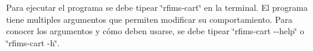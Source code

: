Para ejecutar el programa se debe tipear \char`\"{}rfims-\/cart\char`\"{} en la terminal. El programa tiene multiples argumentos que permiten modificar su comportamiento. Para conocer los argumentos y cómo deben usarse, se debe tipear \char`\"{}rfims-\/cart -\/-\/help\char`\"{} o \char`\"{}rfims-\/cart -\/h\char`\"{}. 
